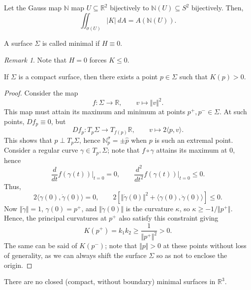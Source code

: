 \documentclass[11pt]{article}
\newcommand{\R}{\mathbb{R}}
\newcommand{\N}{\mathbb{N}}
\newcommand{\ip}[2]{\langle #1, #2 \rangle}
\newcommand{\norm}[1]{\Vert #1 \Vert}
\newcommand{\dd}[2]{\frac{d #1}{d #2}}
\newcommand{\ddn}[3][]{\frac{d^{#1} #2}{d #3^{#1}}}
\theoremstyle{definition}
\theoremstyle{remark}
\newtheorem*{remark}{Remark}
\numberwithin{equation}{section}
\begin{document}
    \begin{corollary}
        Let the Gauss map $\N$ map $U\subseteq \R^2$ bijectively to $\N(U) \subseteq
        S^2$ bijectively. Then, \[
            \iint_{\sigma(U)} |K|\:dA = A(\N(U)).
        \] 
    \end{corollary}


    \begin{definition}
        A surface $\Sigma$ is called minimal if $H \equiv 0$.
        \begin{remark}
            Note that $H = 0$ forces $K \leq 0$.
        \end{remark}
    \end{definition}
    

    \begin{theorem}
        If $\Sigma$ is a compact surface, then there exists a point $p \in \Sigma$
        such that $K(p) > 0$.
    \end{theorem}
    \begin{proof}
        Consider the map \[
            f\colon \Sigma \to \R, \qquad v\mapsto \norm{v}^2.
        \] This map must attain its maximum and minimum at points $p^+, p^- \in
        \Sigma$. At such points, $Df_p \equiv 0$, but \[
            Df_p\colon T_p\Sigma \to T_{f(p)}\R, \qquad v \mapsto 2\ip{p}{v}.
        \] This shows that $p \perp T_p\Sigma$, hence $\N^\sigma_p = \pm \hat{p}$
        when $p$ is such an extremal point. Consider a regular curve $\gamma \in
        T_{p^+}\Sigma$; note that $f\circ \gamma$ attains its maximum at $0$, hence
        \[
            \dd{}{t}f(\gamma(t))\Big|_{t = 0} = 0, \qquad
            \ddn[2]{}{t}f(\gamma(t))\Big|_{t = 0} \leq 0.
        \] Thus, \[
            2\ip{\gamma(0)}{\dot{\gamma}(0)} = 0, \qquad
            2[\norm{\dot{\gamma}(0)}^2 + \ip{\gamma(0)}{\ddot{\gamma}(0)}] \leq
            0.
        \] Now $\norm{\dot{\gamma}} = 1$, $\gamma(0) = p^+$, and
        $\norm{\ddot{\gamma}(0)}$ is the curvature $\kappa$, so $\kappa \geq -1 /
        \norm{p^+}$. Hence, the principal curvatures at $p^+$ also satisfy this
        constraint giving \[
            K(p^+) = k_1k_2 \geq \frac{1}{\norm{p^+}^2} > 0.
        \] The same can be said of $K(p^-)$; note that $\norm{p} > 0$ at these
        points without loss of generality, as we can always shift the surface
        $\Sigma$ so as not to enclose the origin.
    \end{proof}
    
    \begin{corollary}
        There are no closed (compact, without boundary) minimal surfaces in $\R^3$.
    \end{corollary}
\end{document}
